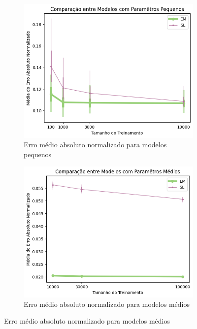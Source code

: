 \documentclass{subfiles}
\begin{document}
\begin{figure}
    \centering
    \begin{subfigure}[b]{0.3\linewidth}
        \centering
        \includegraphics[width=\linewidth]{Figures/resultados/small_abs_norm_prob_error}
        \caption{Erro médio absoluto normalizado para modelos pequenos}
    \end{subfigure}
    \hfill
    \begin{subfigure}[b]{0.3\linewidth}
        \centering
        \includegraphics[width=\linewidth]{Figures/resultados/medium_abs_norm_prob_error}
        \caption{Erro médio absoluto normalizado para modelos médios}
    \end{subfigure}

\end{figure}
\end{document}
